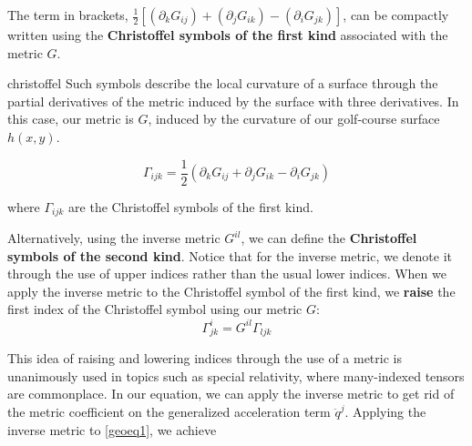The term in brackets, $\frac{1}{2}\left[(\partial_k G_{ij}) + (\partial_jG_{ik})-(\partial_iG_{jk})\right]$, can be compactly written using the \textbf{Christoffel symbols of the first kind} associated with the metric $G$. 

\begin{smjdefinition}{christoffel}
	Such symbols describe the local curvature of a surface through the partial derivatives of the metric induced by the surface with three derivatives. In this case, our metric is $G$, induced by the curvature of our golf-course surface $h(x,y)$.

	$$\Gamma_{ijk} = \frac{1}{2}\left(\partial_k G_{ij} + \partial_j G_{ik} - \partial_i G_{jk}\right)$$
\end{smjdefinition}

where $\Gamma_{ijk}$ are the Christoffel symbols of the first kind.

\vspace{1em}

Alternatively, using the inverse metric $G^{il}$, we can define the \textbf{Christoffel symbols of the second kind}. Notice that for the inverse metric, we denote it through the use of upper indices rather than the usual lower indices. When we apply the inverse metric to the Christoffel symbol of the first kind, we \textbf{raise} the first index of the Christoffel symbol using our metric $G$:
\begin{equation}
	\Gamma^i_{jk} = G^{il} \Gamma_{ljk}
\end{equation}

This idea of raising and lowering indices through the use of a metric is unanimously used in topics such as special relativity, where many-indexed tensors are commonplace. In our equation, we can apply the inverse metric to get rid of the metric coefficient on the generalized acceleration term $\ddot q^j$. Applying the inverse metric to \ref{geoeq1}, we achieve

